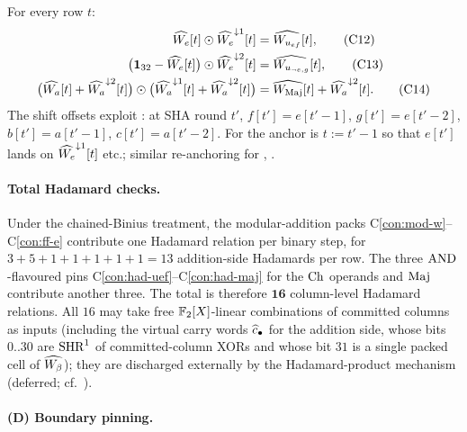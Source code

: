 For every row $t$:
\begin{align}
\widehat{W_e}[t] \odot \widehat{W_e}^{\downarrow 1}[t]
   &= \widehat{W_{u_{ef}}}[t], \tag{C12}\label{con:had-uef}\\
\bigl(\mathbf{1}_{32} - \widehat{W_e}[t]\bigr) \odot \widehat{W_e}^{\downarrow 2}[t]
   &= \widehat{W_{u_{\neg e,g}}}[t], \tag{C13}\label{con:had-uneg}\\
\bigl(\widehat{W_a}[t] + \widehat{W_a}^{\downarrow 2}[t]\bigr) \odot \bigl(\widehat{W_a}^{\downarrow 1}[t] + \widehat{W_a}^{\downarrow 2}[t]\bigr)
   &= \widehat{W_{\operatorname{Maj}}}[t] + \widehat{W_a}^{\downarrow 2}[t]. \tag{C14}\label{con:had-maj}
\end{align}
The shift offsets exploit : at SHA round $t'$,
$f[t'] = e[t'-1]$, $g[t'] = e[t'-2]$, $b[t']=a[t'-1]$, $c[t']=a[t'-2]$.
For  the anchor is $t := t' - 1$ so that $e[t']$ lands
on $\widehat{W_e}^{\downarrow 1}[t]$ etc.; similar re-anchoring for
, .

\paragraph{Total Hadamard checks.}\label{con:had-total}

Under the chained-Binius treatment, the modular-addition packs
C\ref{con:mod-w}--C\ref{con:ff-e} contribute one Hadamard relation
per binary step, for $3 + 5 + 1 + 1 + 1 + 1 + 1 = 13$ addition-side
Hadamards per row. The three $\operatorname{AND}$-flavoured pins
C\ref{con:had-uef}--C\ref{con:had-maj} for the $\operatorname{Ch}$ operands and
$\operatorname{Maj}$ contribute another three. The total is therefore $\mathbf{16}$
column-level Hadamard relations. All $16$ may take free
$\mathbb{F}_2[X]$-linear combinations of committed columns as inputs
(including the virtual carry words $\widehat{c}_\bullet$ for the addition
side, whose bits $0..30$ are $\operatorname{SHR}^{1}$ of committed-column XORs and
whose bit $31$ is a single packed cell of $\widehat{W_\beta}$); they are
discharged externally by the Hadamard-product mechanism (deferred;
cf.\ ).


\paragraph{(D) Boundary pinning.}

